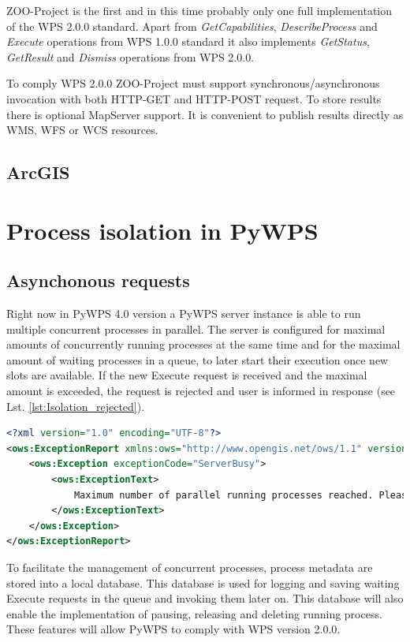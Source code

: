 \documentclass[12pt,a4paper]{article}
\begin{document}
ZOO-Project is the first and in this time probably only one full implementation of the WPS 2.0.0 standard. Apart from \textit{GetCapabilities},
\textit{DescribeProcess} and \textit{Execute} operations from WPS 1.0.0 standard it also implements \textit{GetStatus}, \textit{GetResult}
and \textit{Dismiss} operations from WPS 2.0.0.

To comply WPS 2.0.0 ZOO-Project must support synchronous/asynchronous invocation with both HTTP-GET and HTTP-POST request. To store 
results there is optional MapServer support. It is convenient to publish results directly as WMS, WFS or WCS resources.

\subsection{ArcGIS}

\newpage
\section{Process isolation in PyWPS}
\subsection{Asynchonous requests}
Right now in PyWPS 4.0 version a PyWPS server instance is able to run multiple
concurrent processes in parallel. The server is configured for maximal amounts of concurrently running processes at
the same time and for the maximal amount of waiting processes in a queue, to later start their execution once new
slots are available. If the new Execute request is received and the maximal amount is exceeded, the request is rejected
and user is informed in response (see Lst. \ref{lst:Isolation_rejected}).

\begin{lstlisting}[basicstyle=\small,caption={Resource exceeded exception},language=XML,label={lst:Isolation_rejected}]
<?xml version="1.0" encoding="UTF-8"?>
<ows:ExceptionReport xmlns:ows="http://www.opengis.net/ows/1.1" version="1.0.0">
    <ows:Exception exceptionCode="ServerBusy">
        <ows:ExceptionText>
            Maximum number of parallel running processes reached. Please try later.
        </ows:ExceptionText>
    </ows:Exception>
</ows:ExceptionReport>
\end{lstlisting}

To facilitate the management of concurrent processes, process metadata are stored into a local database. This database is used
for logging and saving waiting Execute requests in the queue and invoking them later on.
This database will also enable the implementation of pausing, releasing and deleting running process. These features will
allow PyWPS to comply with WPS version 2.0.0.
\end{document}
